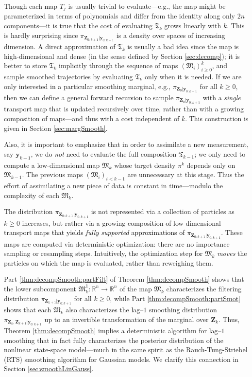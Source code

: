 \documentclass[twoside,11pt]{article}
\newcommand{\re}{\mathbb{R}}
\newcommand{\ra}{\rightarrow}
\newcommand{\yb}{\boldsymbol{y}}
\newcommand{\Zb}{\boldsymbol{Z}}
\newcommand{\submap}{\mathfrak{M}}
\begin{document}
%
%
Though each map $T_j$ is usually trivial to evaluate---e.g., the map might be
parameterized in terms of polynomials \citep{marzouk2016introduction}
and %
differ from the identity along only %
$2n$ components---it is
true that the cost of evaluating $\mathfrak{T}_k$ grows linearly
with $k$. %
 This is hardly surprising since
$\pi_{\Zb_{0:k+1} \vert \yb_{0:k+1}}$ is a density
over spaces of increasing dimension. A direct approximation of $\mathfrak{T}_k$ is
usually a bad idea since the map is high-dimensional and dense (in the sense
defined by Section \ref{sec:decomp}); it is better to store $\mathfrak{T}_k$
implicitly through the sequence of maps $(\submap_i)_{i\ge0}^k$, and 
sample smoothed trajectories by evaluating $\mathfrak{T}_k$
%
%
only when it is needed.
%
If we
are only interested in a particular smoothing marginal, 
e.g.,
$\pi_{\Zb_{0} \vert \yb_{0:k+1}}$ for all $k\ge 0$, then we can define
a general forward recursion to sample $\pi_{\Zb_{0} \vert \yb_{0:k+1}}$
with a {\it single} transport map that is updated recursively
over %
%
%
time, rather than with a growing composition of maps---and thus with 
a cost independent of $k$. This construction is given in 
Section \ref{sec:margSmooth}.

%
%

Also, it is important to emphasize that in order to assimilate a new measurement,
say $\yb_{k+1}$, we do \emph{not} need to evaluate the full composition  $\mathfrak{T}_{k-1}$; we only need
to compute a low-dimensional map $\submap_k$ whose target density $\pi^k$
depends only on $\submap_{k-1}$. The previous maps $(\submap_i)_{i<k-1}$
are unnecessary at this stage. Thus the effort of assimilating a new piece
of data is constant in time---modulo the complexity of each $\submap_k$.

%
The distribution $\pi_{\Zb_{0:k+1}\vert \yb_{0:k+1}}$ is {not}
represented via a  collection of particles as $k\ge 0$
increases, but rather via a growing composition of low-dimensional 
transport
maps
\textcolor{black}{
that yields {\it fully supported} approximations of $\pi_{\Zb_{0:k+1}\vert \yb_{0:k+1}}$.
}
%
%
%
These maps are computed via deterministic optimization:
there are no importance sampling or resampling steps.
%
%
%
Intuitively, the optimization step for $\submap_k$ {\it moves} the
particles on which
the map is evaluated, rather than reweighing them.
%
%
%
%
%
%


%
%
%
%
Part \ref{thm:decompSmooth:partFilt} of Theorem \ref{thm:decompSmooth}
shows that the lower subcomponent $\submap_k^1:\re^n \ra \re^n$ of the map
$\submap_k$ characterizes the filtering distribution
$\pi_{\Zb_{k+1} \vert \yb_{0:k+1}}$  for all $k\ge 0$, while
Part \ref{thm:decompSmooth:partSmot}
shows
that each $\submap_k$ also characterizes the lag--$1$ smoothing
distribution $\pi_{ \Zb_k ,\Zb_{k+1} \vert \yb_{0:k+1}}$ up to an invertible transformation of the marginal over $\Zb_k$.
Thus, Theorem \ref{thm:decompSmooth} 
implies a deterministic algorithm for lag--$1$ smoothing 
%
that in fact fully characterizes the posterior 
distribution of the nonlinear state-space model---much in the same spirit as the 
Rauch-Tung-Striebel (RTS) smoothing algorithm for Gaussian models.
We clarify this connection in Section \ref{sec:smoothLinGauss}. 
\end{document}
